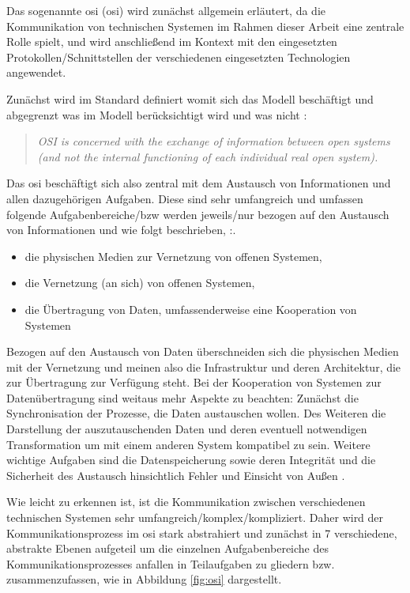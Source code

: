 Das sogenannte \acrlong{osi} (\acrshort{osi}) wird zunächst allgemein erläutert, da die Kommunikation von technischen Systemen im Rahmen dieser Arbeit eine zentrale Rolle spielt, und wird anschließend im Kontext mit den eingesetzten Protokollen/Schnittstellen der verschiedenen eingesetzten Technologien angewendet.

Zunächst wird im Standard definiert womit sich das Modell beschäftigt und abgegrenzt was im Modell berücksichtigt wird und was nicht \cite[S.~3]{osi96}:

\begin{quote}
\textit{\Gun OSI is concerned with the exchange of information between open systems (and not the internal functioning of each individual real open system).\Gob}
\end{quote}

Das \acrshort{osi} beschäftigt sich also zentral mit dem Austausch von Informationen und allen dazugehörigen Aufgaben. Diese sind sehr umfangreich und umfassen folgende Aufgabenbereiche/bzw werden jeweils/nur bezogen auf den Austausch von Informationen und wie folgt beschrieben, \cite[S.~3f.]{osi96}:.

\begin{itemize}
\item die physischen Medien zur Vernetzung von offenen Systemen,
\item die Vernetzung (an sich) von offenen Systemen,
\item die Übertragung von Daten, umfassenderweise eine Kooperation von Systemen
\end{itemize}

Bezogen auf den Austausch von Daten überschneiden sich die physischen Medien mit der Vernetzung und meinen also die Infrastruktur und deren Architektur, die zur Übertragung zur Verfügung steht. Bei der Kooperation von Systemen zur Datenübertragung sind weitaus mehr Aspekte zu beachten: Zunächst die Synchronisation der Prozesse, die Daten austauschen wollen. Des Weiteren die Darstellung der auszutauschenden Daten und deren eventuell notwendigen Transformation um mit einem anderen System kompatibel zu sein. Weitere wichtige Aufgaben sind die Datenspeicherung sowie deren Integrität und die Sicherheit des Austausch hinsichtlich Fehler und Einsicht von Außen \cite[S.~4]{osi96}.

Wie leicht zu erkennen ist, ist die Kommunikation zwischen verschiedenen technischen Systemen sehr umfangreich/komplex/kompliziert. Daher wird der Kommunikationsprozess im \acrshort{osi} stark abstrahiert und zunächst in 7 verschiedene, abstrakte Ebenen aufgeteil um die einzelnen Aufgabenbereiche des Kommunikationsprozesses anfallen in Teilaufgaben zu gliedern bzw. zusammenzufassen, wie in Abbildung \ref{fig:osi} dargestellt.

